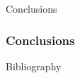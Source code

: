 \documentclass{beamer}
\begin{document}
\begin{frame}
\begin{center} 
	 Conclusions
\end{center}
\end{frame}

\begin{frame}
\frametitle{Conclusions}
\end{frame}

\nocite{*}
\begin{frame}{Bibliography}
\renewcommand*{\bibfont}{\footnotesize}
\printbibliography
\end{frame}
\end{document}
